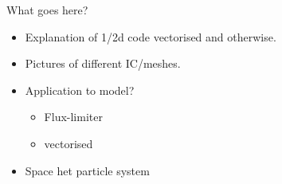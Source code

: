 \documentclass[11pt,a4paper]{article}
\begin{document}
    
    What goes here?
    \begin{itemize}
    \item    Explanation of 1/2d code vectorised and otherwise.
    \item    Pictures of different IC/meshes.
    \item    Application to model?
        \begin{itemize}
            \item Flux-limiter
            \item vectorised
        \end{itemize}
    \item Space het particle system 
    \end{itemize}        
    
\end{document}

